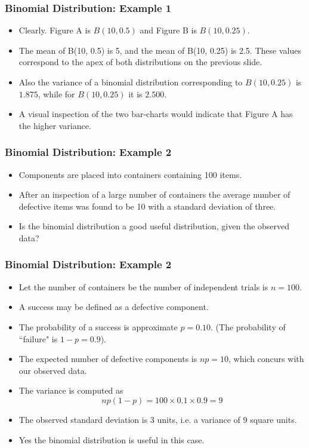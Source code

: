 \documentclass[a4]{beamer}
\begin{document}
\begin{frame}
\frametitle{Binomial Distribution: Example 1}
\begin{itemize}
\item Clearly. Figure A is $B(10, 0.5)$ and Figure B is $B(10, 0.25)$.
\item The mean of B(10, 0.5) is 5, and the mean of B(10, 0.25) is 2.5. These values correspond to the apex of both distributions on the previous slide.
\item Also the variance of a binomial distribution corresponding to $B(10, 0.25)$ is $1.875$, while for $B(10, 0.25)$ it is $2.500$.
\item A visual inspection of the two bar-charts would indicate that Figure A has the higher variance.
\end{itemize}
\end{frame}
\begin{frame}
\frametitle{Binomial Distribution: Example 2}

\begin{itemize}
\item Components are placed into containers containing 100 items.
\item After an inspection of a large number of containers the average number of defective items was found to be 10 with a standard deviation of three.
\item Is the binomial distribution a good useful distribution, given the observed data?
\end{itemize}
\end{frame}
\begin{frame}
\frametitle{Binomial Distribution: Example 2}

\begin{itemize}
\item Let the number of containers be the number of independent trials is $n=100$.
\item A success may be defined as a defective component.
\item The probability of a success is approximate $p=0.10$. (The probability of ``failure" is $1-p=0.9$).
\item The expected number of defective components is $np=10$, which concurs with our observed data.
\item The variance is computed as \[np(1-p) = 100 \times 0.1 \times 0.9 = 9\]
\item The observed standard deviation is 3 units, i.e. a variance of 9 square units.
\item Yes the binomial distribution is useful in this case.
\end{itemize}
\end{frame}
\end{document}
